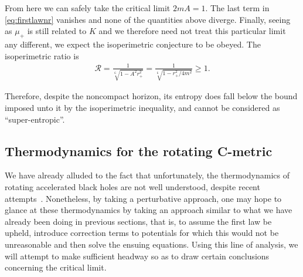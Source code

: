 \documentclass[
twoside,
openright,
frontopenright,
]{dmathesis}
\begin{document}
From here we can safely take the critical limit $2mA = 1$. The last term in
\cref{eq:firstlawnr} vanishes and none of the quantities above diverge. Finally,
seeing as $\mu_+$ is still related to $K$ and we therefore need not treat this
particular limit any different, we expect the isoperimetric
conjecture to be obeyed. The isoperimetric ratio is
\begin{align}
  \mathcal{R} =\frac{1}{\sqrt[6~]{1-A^2r_+^2}} =
  \frac{1}{\sqrt[6~]{1-r_+^2/4m^2}}\geqslant 1. 
\end{align}

Therefore, despite the noncompact horizon, its entropy does fall below the bound
imposed unto it by the isoperimetric inequality, and cannot be considered as
``super-entropic''.

\subsection{Thermodynamics for the rotating C-metric}

We have already alluded to the fact that unfortunately, the thermodynamics of
rotating accelerated black holes are not well understood, despite recent
attempts~\cite{Astorino:2016ybm}. Nonetheless, by taking a perturbative
approach, one may hope to glance at these thermodynamics by taking an approach
similar to what we have already been doing in previous sections, that is, to
assume the first law be upheld, introduce correction terms to potentials for
which this would not be unreasonable and then solve the ensuing equations. Using
this line of analysis, we will attempt to make sufficient headway so as to draw
certain conclusions concerning the critical limit.
\end{document}
